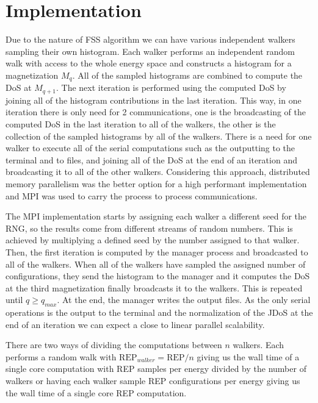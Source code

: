 \section{Implementation}

	Due to the nature of FSS algorithm we can have various independent walkers sampling their own histogram. Each walker performs an independent random walk with access to the whole energy space and constructs a histogram for a magnetization $M_q$. All of the sampled histograms are combined to compute the DoS at $M_{q+1}$. The next iteration is performed using the computed DoS by joining all of the histogram contributions in the last iteration.
This way, in one iteration there is only need for 2 communications, one is the broadcasting of the computed DoS in the last iteration to all of the walkers, the other is the collection of the sampled histograms by all of the walkers. There is a need for one walker to execute all of the serial computations such as the outputting to the terminal and to files, and joining all of the DoS at the end of an iteration and broadcasting it to all of the other walkers. Considering this approach, distributed memory parallelism was the better option for a high performant implementation and MPI was used to carry the process to process communications.
	
	The MPI implementation starts by assigning each walker a different seed for the RNG, so the results come from different streams of random numbers. This is achieved by multiplying a defined seed by the number assigned to that walker. Then, the first iteration is computed by the manager process and broadcasted to all of the walkers. When all of the walkers have sampled the assigned number of configurations, they send the histogram to the manager and it computes the DoS at the third magnetization finally broadcasts it to the walkers. This is repeated until $q \geqslant q_{max}$. At the end, the manager writes the output files. As the only serial operations is the output to the terminal and the normalization of the JDoS at the end of an iteration we can expect a close to linear parallel scalability.

	There are two ways of dividing the computations between $n$ walkers. Each performs a random walk with $\text{REP}_{walker} = \text{REP} / n$ giving us the wall time of a single core computation with REP samples per energy divided by the number of walkers or having each walker sample REP configurations per energy giving us the wall time of a single core REP computation. 
 
